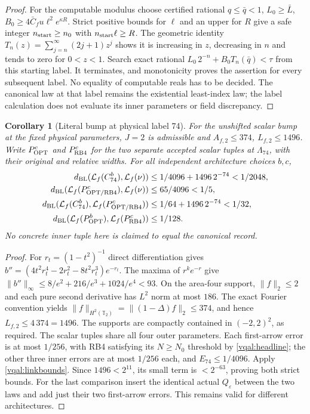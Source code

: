 \documentclass[11pt]{article}
\theoremstyle{plain}
\newtheorem{corollary}[theorem]{Corollary}
\theoremstyle{definition}
\theoremstyle{remark}
\newcommand{\T}{\mathbb{T}}
\begin{document}
\begin{proof}
For the computable modulus choose certified rational $q\le\bar q<1$,
$L_0\ge\bar L$, $B_0\ge4\bar C_fu\ell^2e^{\kappa R}$.
Strict positive bounds for $\ell$ and an upper for $R$ give a safe
integer $n_{\rm start}\ge n_0$ with $n_{\rm start}\ell\ge R$.
The geometric identity
$T_n(z)=\sum_{j=n}^\infty(2j+1)z^j$ shows it is increasing in $z$,
decreasing in $n$ and tends to zero for $0<z<1$.
Search exact rational $L_0\,2^{-n}+B_0T_n(\bar q)<\tau$ from this
starting label. It terminates, and monotonicity proves the assertion
for every subsequent label. No equality of computable reals has to be
decided. The canonical law at that label remains the existential
least-index law; the label calculation does not evaluate its inner
parameters or field discrepancy.
\end{proof}

\begin{corollary}[Literal bump at physical label 74]
\label{vqal:linkbump}
For the unshifted scalar bump at the fixed physical parameters, $J=2$
is admissible and $A_{f,2}\le374$, $L_{f,2}\le1496$. Write
$P_{\rm OPT}^c$ and $P_{\rm RB4}^c$ for the two separate accepted
scalar tuples at $\Lambda_{74}$, with their original and relative
widths. For all independent architecture choices $b,c$,
\begin{align}\label{vqal:concretelink}
 d_{\rm BL}(\mathcal L_f(C_{74}^b),\mathcal L_f(\nu))
       &\le1/4096+1496\,2^{-74}<1/2048,\nonumber\\
 d_{\rm BL}(\mathcal L_f(P_{\rm OPT/RB4}^c),\mathcal L_f(\nu))
       &\le65/4096<1/5,\nonumber\\
 d_{\rm BL}(\mathcal L_f(C_{74}^b),\mathcal L_f(P_{\rm OPT/RB4}^c))
       &\le1/64+1496\,2^{-74}<1/32,\nonumber\\
 d_{\rm BL}(\mathcal L_f(P_{\rm OPT}^b),\mathcal L_f(P_{\rm RB4}^c))
       &\le1/128.
\end{align}
No concrete inner tuple here is claimed to equal the canonical record.
\end{corollary}

\begin{proof}
For $r_t=(1-t^2)^{-1}$ direct differentiation gives
$b''=(4t^2r_t^4-2r_t^2-8t^2r_t^3)e^{-r_t}$.
The maxima of $r^ke^{-r}$ give
$\|b''\|_\infty\le8/e^2+216/e^3+1024/e^4<93$.
On the area-four support, $\|f\|_2\le2$ and each pure second
derivative has $L^2$ norm at most $186$.
The exact Fourier convention yields
$\|f\|_{H^2(\T_2)}=\|(1-\Delta)f\|_2\le374$, and hence
$L_{f,2}\le4\,374=1496$. The supports are compactly contained in
$(-2,2)^2$, as required.
The scalar tuples share all four outer parameters. Each first-arrow
error is at most $1/256$, with RB4 satisfying its $N\ge N_0$
threshold by \eqref{vqal:headline}; the other three inner errors are
at most $1/256$ each, and $E_{74}\le1/4096$.
Apply \eqref{vqal:linkbounds}. Since $1496<2^{11}$, its small term
is $<2^{-63}$, proving both strict bounds.
For the last comparison insert the identical actual
$Q_\varepsilon$ between the two laws and add just their two
first-arrow errors. This remains valid for different architectures.
\end{proof}
\end{document}
